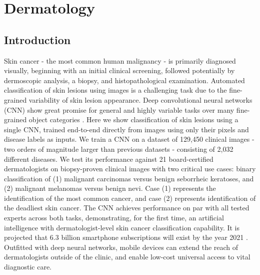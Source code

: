 \chapter{Dermatology}

\section{Introduction}
Skin cancer - the most common human malignancy \cite{society2016cancer, rogers2015incidence, stern2010prevalence} - is primarily diagnosed visually, beginning with an initial clinical screening, followed potentially by dermoscopic analysis, a biopsy, and histopathological examination. Automated classification of skin lesions using images is a challenging task due to the fine-grained variability of skin lesion appearance. Deep convolutional neural networks (CNN) \cite{lecun2015deep, lecun1998handbook} show great promise for general and highly variable tasks over many fine-grained object categories \cite{russakovsky2015imagenet, krizhevsky2012imagenet, ioffe2015batch,  szegedy2016rethinking, szegedy2015going, he2016deep}. Here we show classification of skin lesions using a single CNN, trained end-to-end directly from images using only their pixels and disease labels as inputs. We train a CNN on a dataset of 129,450 clinical images - two orders of magnitude larger than previous datasets \cite{masood2013computer} - consisting of 2,032 different diseases. We test its performance against 21 board-certified dermatologists on biopsy-proven clinical images with two critical use cases: binary classification of (1) malignant carcinomas versus benign seborrheic keratoses, and (2) malignant melanomas versus benign nevi. Case (1) represents the identification of the most common cancer, and case (2) represents identification of the deadliest skin cancer. The CNN achieves performance on par with all tested experts across both tasks, demonstrating, for the first time, an artificial intelligence with dermatologist-level skin cancer classification capability. It is projected that 6.3 billion smartphone subscriptions will exist by the year 2021 \cite{cerwall2015ericsson}. Outfitted with deep neural networks, mobile devices can extend the reach of dermatologists outside of the clinic, and enable low-cost universal access to vital diagnostic care. 

